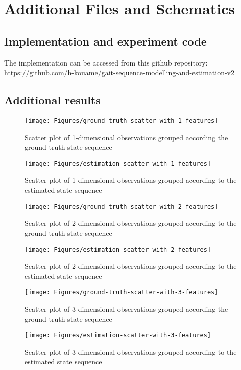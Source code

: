 \chapter{Additional Files and Schematics}

\section{Implementation and experiment code} \label{apdix-repo}
The implementation can be accessed from this github repository: \href{https://github.com/h-kouame/gait-sequence-modelling-and-estimation-v2}{https://github.com/h-kouame/gait-sequence-modelling-and-estimation-v2}

\section{Additional results} \label{apdix-results}

\begin{figure}[ht!]
	\texttt{[image: Figures/ground-truth-scatter-with-1-features]}
	\caption{Scatter plot of  1-dimensional observations grouped according the ground-truth state sequence}
	\label{fig:gt-1dim}
\end{figure}
\begin{figure}[ht!]
	\texttt{[image: Figures/estimation-scatter-with-1-features]}
	\caption{Scatter plot of 1-dimensional observations grouped according to the estimated state sequence}
	\label{fig:es-1dim}
\end{figure}

\begin{figure}[ht!]
	\texttt{[image: Figures/ground-truth-scatter-with-2-features]}
	\caption{Scatter plot of 2-dimensional observations grouped according to the ground-truth state sequence}
	\label{fig:gt-2dim}
\end{figure}

\begin{figure}[ht!]
	\texttt{[image: Figures/estimation-scatter-with-2-features]}
	\caption{Scatter plot of 2-dimensional observations grouped according to the estimated state sequence}
	\label{fig:es-2dim}
\end{figure}

\begin{figure}[ht!]
	\texttt{[image: Figures/ground-truth-scatter-with-3-features]}
	\caption{Scatter plot of  3-dimensional observations grouped according the ground-truth state sequence}
	\label{fig:gt-3dim}
\end{figure}
\begin{figure}[ht!]
	\texttt{[image: Figures/estimation-scatter-with-3-features]}
	\caption{Scatter plot of 3-dimensional observations grouped according to the estimated state sequence}
	\label{fig:es-3dim}
\end{figure}

